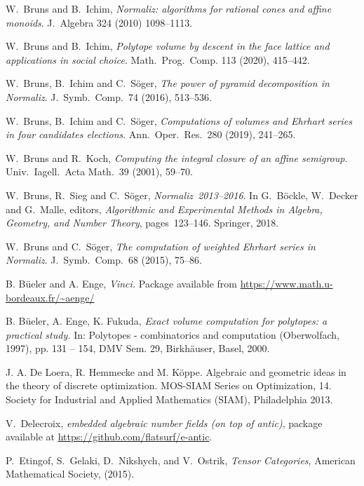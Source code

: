 \documentclass[12pt,a4paper]{scrartcl}
\theoremstyle{definition}
\begin{document}
\begin{thebibliography}{15.}
W.~Bruns and B.~Ichim,
\emph{Normaliz: algorithms for rational cones and affine monoids}.
J.\ Algebra 324 (2010) 1098--1113.

W.~Bruns and B.~Ichim,
\emph{Polytope volume by descent in the face lattice and applications in social choice}.
Math.\ Prog.\ Comp. 113 (2020), 415--442.

W.~Bruns, B.~Ichim and C.~S\"oger,
\emph{The power of pyramid decomposition in Normaliz}.
J.\ Symb.\ Comp.\ 74 (2016), 513--536.

W.~Bruns, B.~Ichim and C.~S\"oger,
\emph{Computations of volumes and Ehrhart series in four candidates elections}.
Ann.\ Oper.\ Res.\ 280 (2019), 241--265.

W.~Bruns and R.~Koch,
\emph{Computing the integral closure of an affine semigroup}.
Univ.\ Iagell.\ Acta Math.\ 39 (2001), 59--70.

W.~Bruns, R.~Sieg and C.~S\"oger,
\emph{Normaliz~2013--2016}.
In
G.~B\"ockle, W.~Decker and G.~Malle, editors,
\emph{Algorithmic and Experimental Methods in Algebra, Geometry, and Number Theory},
pages~123--146.
Springer, 2018.

W.~Bruns and C.~S\"oger,
\emph{The computation of weighted Ehrhart series in Normaliz}.
J.\ Symb.\ Comp.\ 68 (2015), 75--86.

 B. B\"{u}eler and A. Enge, \emph{Vinci.} Package available from \url{https://www.math.u-bordeaux.fr/~aenge/}

B. Büeler, A. Enge, K. Fukuda, \emph{Exact volume computation for polytopes: a practical study.} In: Polytopes - combinatorics and computation (Oberwolfach, 1997), pp. 131 -- 154,
DMV Sem. 29, Birkhäuser, Basel, 2000.

J. A. De Loera, R. Hemmecke and M. Köppe.
Algebraic and geometric ideas in the theory of discrete optimization.
MOS-SIAM Series on Optimization, 14. Society for Industrial and Applied Mathematics (SIAM), Philadelphia 2013.

V.~Delecroix,
\emph{embedded algebraic number fields (on top of antic)},
package available at \url{https://github.com/flatsurf/e-antic}.

P.~Etingof, S.~Gelaki, D.~Nikshych, and V.~Ostrik, {\em Tensor Categories}, American Mathematical Society, (2015).


\end{thebibliography}
\end{document}
